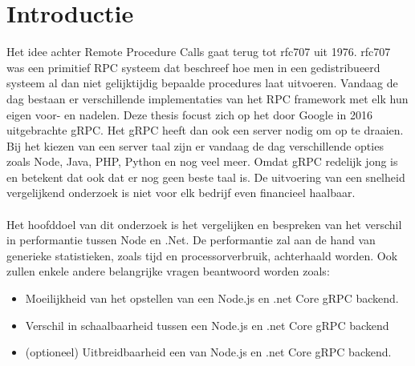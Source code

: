 
\section{Introductie} %
\label{sec:introductie}
Het idee achter Remote Procedure Calls gaat terug tot rfc707 uit 1976. rfc707 was een primitief RPC systeem dat beschreef hoe men in een gedistribueerd systeem al dan niet gelijktijdig bepaalde procedures laat uitvoeren. Vandaag de dag bestaan er verschillende implementaties van het RPC framework met elk hun eigen voor- en nadelen. Deze thesis focust zich op het door Google in 2016 uitgebrachte gRPC. Het gRPC heeft dan ook een server nodig om op te draaien. Bij het kiezen van een server taal zijn er vandaag de dag verschillende opties zoals Node, Java, PHP, Python en nog veel meer. Omdat gRPC redelijk jong is en betekent dat ook dat er nog geen beste taal is. De uitvoering van een snelheid vergelijkend onderzoek is niet voor elk bedrijf even financieel haalbaar. \\ \\ Het hoofddoel van dit onderzoek is het vergelijken en bespreken van het verschil in performantie tussen Node en .Net. De performantie zal aan de hand van generieke statistieken, zoals tijd en processorverbruik,  achterhaald worden. Ook zullen enkele andere belangrijke vragen beantwoord worden zoals:
\begin{itemize}
	\item Moeilijkheid van het opstellen van een Node.js en .net Core gRPC backend.
	\item Verschil in schaalbaarheid tussen een Node.js en .net Core gRPC backend
	\item (optioneel) Uitbreidbaarheid een van Node.js en .net Core gRPC backend.
\end{itemize}


